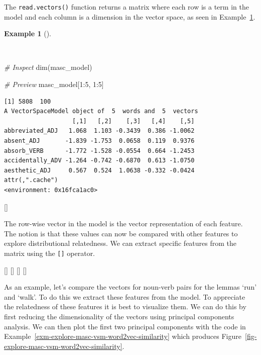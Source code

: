 \documentclass[
  letterpaper,
  krantz1]{latex/krantz-mod}
\newenvironment{Shaded}{\begin{snugshade}}{\end{snugshade}}
\newcommand{\CommentTok}[1]{\textcolor[rgb]{0.00,0.00,0.00}{\textit{#1}}}
\newcommand{\DecValTok}[1]{\textcolor[rgb]{0.00,0.00,0.00}{#1}}
\newcommand{\FunctionTok}[1]{\textcolor[rgb]{0.00,0.00,0.00}{#1}}
\newcommand{\NormalTok}[1]{\textcolor[rgb]{0.00,0.00,0.00}{#1}}
\newcommand{\SpecialCharTok}[1]{\textcolor[rgb]{0.00,0.00,0.00}{#1}}
\newcommand{\cindex}[1]{%
  \StrSubstitute{#1}{_}{\_}[\temp]%
  \index{\temp}%
}
\theoremstyle{definition}
\theoremstyle{definition}
\newtheorem{example}{Example}[chapter]
\theoremstyle{remark}
\begin{document}
The \texttt{read.vectors()} function returns a matrix where each row is
a term in the model and each column is a dimension in the vector space,
as seen in Example~\ref{exm-explore-masc-vsm-word2vec-vector-object}.

\begin{example}[]\protect\hypertarget{exm-explore-masc-vsm-word2vec-vector-object}{}\label{exm-explore-masc-vsm-word2vec-vector-object}

~

\begin{Shaded}
\begin{Highlighting}[numbers=left,,]
\CommentTok{\# Inspect}
\FunctionTok{dim}\NormalTok{(masc\_model)}

\CommentTok{\# Preview}
\NormalTok{masc\_model[}\DecValTok{1}\SpecialCharTok{:}\DecValTok{5}\NormalTok{, }\DecValTok{1}\SpecialCharTok{:}\DecValTok{5}\NormalTok{]}
\end{Highlighting}
\end{Shaded}

\begin{verbatim}
[1] 5808  100
A VectorSpaceModel object of  5  words and  5  vectors
                   [,1]   [,2]    [,3]   [,4]    [,5]
abbreviated_ADJ   1.068  1.103 -0.3439  0.386 -1.0062
absent_ADJ       -1.839 -1.753  0.0658  0.119  0.9376
absorb_VERB      -1.772 -1.528 -0.0554  0.664 -1.2453
accidentally_ADV -1.264 -0.742 -0.6870  0.613 -1.0750
aesthetic_ADJ     0.567  0.524  1.0638 -0.332 -0.0424
attr(,".cache")
<environment: 0x16fca1ac0>
\end{verbatim}

\cindex{dim()}

\end{example}

The row-wise vector in the model is the vector representation of each
feature. The notion is that these values can now be compared with other
features to explore distributional relatedness. We can extract specific
features from the matrix using the \texttt{{[}{]}} operator.

\cindex{str_subset()}\cindex{str_c()}\cindex{rownames()}\cindex{[]}

As an example, let's compare the vectors for noun-verb pairs for the
lemmas `run' and `walk'. To do this we extract these
features from the model. To appreciate the relatedness of these features
it is best to visualize them. We can do this by first reducing the
dimensionality of the vectors using principal components
analysis. We can then plot the
first two principal components with the code in
Example~\ref{exm-explore-masc-vsm-word2vec-similarity} which produces
Figure~\ref{fig-explore-masc-vsm-word2vec-similarity}.
\end{document}
